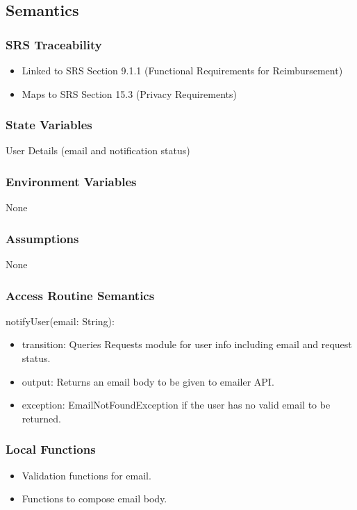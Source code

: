 \documentclass[12pt, titlepage]{article}
\begin{document}
\subsection{Semantics}

\subsubsection{SRS Traceability}
\begin{itemize}
  \item Linked to SRS Section 9.1.1 (Functional Requirements for Reimbursement)
  \item Maps to SRS Section 15.3 (Privacy Requirements)
\end{itemize}

\subsubsection{State Variables}
User Details (email and notification status)

\subsubsection{Environment Variables}
None

\subsubsection{Assumptions}
None

\subsubsection{Access Routine Semantics}

\noindent notifyUser(email: String):
\begin{itemize}
  \item transition: Queries Requests module for user info including email and request status.
  \item output: Returns an email body to be given to emailer API.
  \item exception: EmailNotFoundException if the user has no valid email to be returned.
\end{itemize}

\subsubsection{Local Functions}
\begin{itemize}
  \item Validation functions for email.
  \item Functions to compose email body.
\end{itemize}
\end{document}
